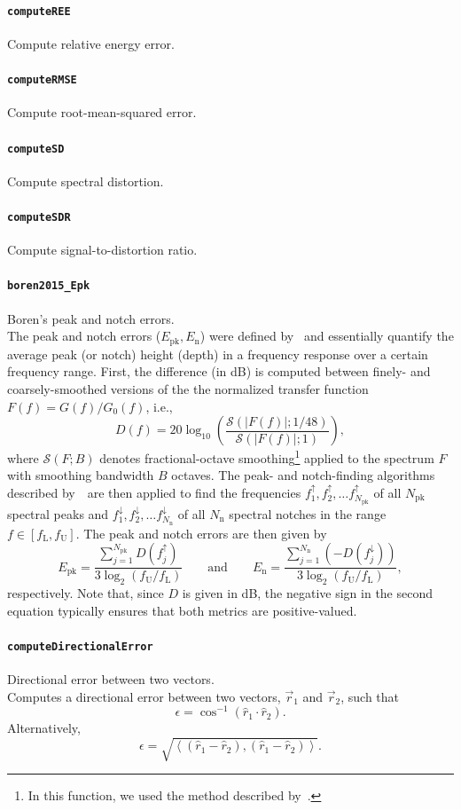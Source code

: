 \documentclass[11pt, oneside]{article}
\newcommand{\function}[1]{\paragraph*{\texttt{#1}}}
\begin{document}
\function{computeREE} Compute relative energy error. \\

\function{computeRMSE} Compute root-mean-squared error. \\

\function{computeSD} Compute spectral distortion. \\

\function{computeSDR} Compute signal-to-distortion ratio. \\

\function{boren2015\_Epk} Boren's peak and notch errors. \\
The peak and notch errors ($E_{\text{pk}}, E_\text{n}$) were defined by~\citet{Boren2015}
and essentially quantify the average peak (or notch) height (depth) in a frequency response over a certain frequency range.
First, the difference (in dB) is computed between finely- and coarsely-smoothed versions of the the normalized transfer function $F(f) = G(f)/G_0(f)$, i.e.,
\begin{equation}
D(f) = 20 \log_{10} \left( \frac{ \mathcal{S}\left( |F(f)|; 1/48 \right) }{ \mathcal{S}\left( |F(f)|; 1 \right) } \right),
\end{equation}
where $\mathcal{S}(F; B)$ denotes fractional-octave smoothing\footnote{In this function, we used the method described by~\citet{Tylka2017}.} applied to the spectrum $F$ with smoothing bandwidth $B$ octaves.
The peak- and notch-finding algorithms described by~\citeauthor{Boren2015}~are then applied to find the frequencies $f_1^\uparrow, f_2^\uparrow, \dots f_{N_\text{pk}}^\uparrow$ of all $N_\text{pk}$ spectral peaks and $f_1^\downarrow, f_2^\downarrow, \dots f_{N_\text{n}}^\downarrow$  of all $N_\text{n}$ spectral notches in the range $f \in [f_\text{L}, f_\text{U}]$.
The peak and notch errors are then given by~\citep[Eq.~(1)]{Boren2015}
\begin{equation}
E_\text{pk} = \frac{\sum_{j = 1}^{N_\text{pk}} D(f_j^\uparrow)}{3 \log_2 (f_\text{U}/f_\text{L})}
\quad\quad\text{and}\quad\quad
E_\text{n} = \frac{\sum_{j = 1}^{N_\text{n}} (-D(f_j^\downarrow))}{3 \log_2 (f_\text{U}/f_\text{L})},
\end{equation}
respectively. Note that, since $D$ is given in dB, the negative sign in the second equation typically ensures that both metrics are positive-valued.

\function{computeDirectionalError} Directional error between two vectors. \\
Computes a directional error between two vectors, $\vec{r}_1$ and $\vec{r}_2$, such that
\begin{equation}
\epsilon = \cos^{-1} \left( \hat{r}_1 \cdot \hat{r}_2 \right).
\end{equation}
Alternatively,
\begin{equation}
\epsilon = \sqrt{ \left\langle \left( \hat{r}_1 - \hat{r}_2 \right), \left( \hat{r}_1 - \hat{r}_2 \right) \right\rangle }.
\end{equation}
\end{document}
